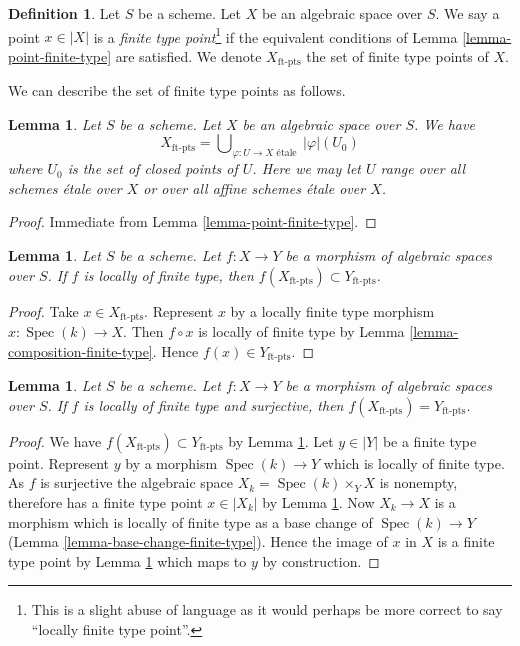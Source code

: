 \documentclass{stacks-project}
\theoremstyle{plain}
\newtheorem{lemma}[subsection]{Lemma}
\theoremstyle{definition}
\newtheorem{definition}[subsection]{Definition}
\theoremstyle{remark}
\numberwithin{equation}{subsection}
\def\Spec{\mathop{\mathrm{Spec}}}
\begin{document}
\begin{definition}
\label{definition-finite-type-point}
Let $S$ be a scheme. Let $X$ be an algebraic space over $S$.
We say a point $x \in |X|$ is a {\it finite type point}\footnote{This is a
slight abuse of language as it would perhaps be more correct to say
``locally finite type point''.} if the equivalent conditions of
Lemma \ref{lemma-point-finite-type}
are satisfied. We denote $X_{\text{ft-pts}}$ the set of finite type points
of $X$.
\end{definition}

\noindent
We can describe the set of finite type points as follows.

\begin{lemma}
\label{lemma-identify-finite-type-points}
Let $S$ be a scheme. Let $X$ be an algebraic space over $S$. We have
$$
X_{\text{ft-pts}} =
\bigcup\nolimits_{\varphi : U \to X\text{ \'etale }} |\varphi|(U_0)
$$
where $U_0$ is the set of closed points of $U$.
Here we may let $U$ range over all schemes \'etale over $X$ or over all
affine schemes \'etale over $X$.
\end{lemma}

\begin{proof}
Immediate from
Lemma \ref{lemma-point-finite-type}.
\end{proof}

\begin{lemma}
\label{lemma-finite-type-points-morphism}
Let $S$ be a scheme.
Let $f : X \to Y$ be a morphism of algebraic spaces over $S$.
If $f$ is locally of finite type, then
$f(X_{\text{ft-pts}}) \subset Y_{\text{ft-pts}}$.
\end{lemma}

\begin{proof}
Take $x \in X_{\text{ft-pts}}$. Represent $x$ by a locally finite type morphism
$x : \Spec(k) \to X$. Then $f \circ x$ is locally of finite type by
Lemma \ref{lemma-composition-finite-type}.
Hence $f(x) \in Y_{\text{ft-pts}}$.
\end{proof}

\begin{lemma}
\label{lemma-finite-type-points-surjective-morphism}
Let $S$ be a scheme.
Let $f : X \to Y$ be a morphism of algebraic spaces over $S$.
If $f$ is locally of finite type and surjective, then
$f(X_{\text{ft-pts}}) = Y_{\text{ft-pts}}$.
\end{lemma}

\begin{proof}
We have $f(X_{\text{ft-pts}}) \subset Y_{\text{ft-pts}}$ by
Lemma \ref{lemma-finite-type-points-morphism}.
Let $y \in |Y|$ be a finite type point. Represent $y$ by a morphism
$\Spec(k) \to Y$ which is locally of finite type.
As $f$ is surjective the algebraic space
$X_k = \Spec(k) \times_Y X$ is nonempty, therefore
has a finite type point $x \in |X_k|$ by
Lemma \ref{lemma-identify-finite-type-points}.
Now $X_k \to X$ is a morphism which is locally of finite type as a base change
of $\Spec(k) \to Y$
(Lemma \ref{lemma-base-change-finite-type}).
Hence the image of $x$ in $X$ is a finite type point by
Lemma \ref{lemma-finite-type-points-morphism}
which maps to $y$ by construction.
\end{proof}
\end{document}
